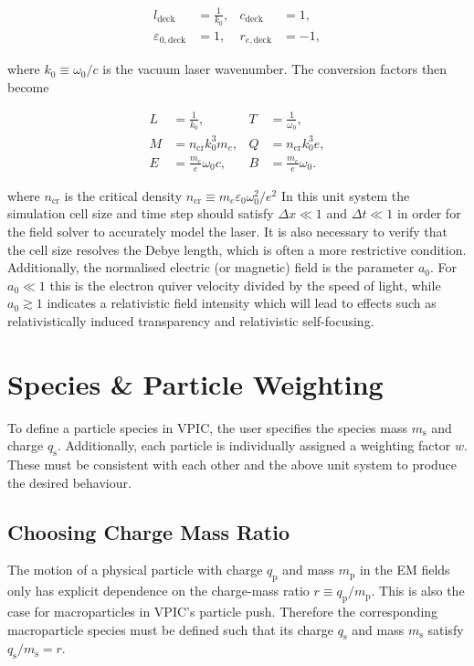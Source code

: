 \documentclass[twocolumn,10pt]{article}
\newcommand{\ncrit}{n_{\mathrm{cr}}}
\begin{document}
	\begin{align*}
		l_{\mathrm{deck}} &= \frac{1}{k_0}, &
		c_{\mathrm{deck}} &= 1, \\
		\varepsilon_{0,\mathrm{deck}} &= 1, &
		r_{e,\mathrm{deck}} &= -1,
	\end{align*}

	\noindent where $k_0 \equiv \omega_0/c$ is the vacuum laser wavenumber. The conversion factors then become

	\begin{align*}
		L &= \frac{1}{k_0}, &
		T &= \frac{1}{\omega_0}, \\
		M &= \ncrit k_0^3m_e, &
		Q &= \ncrit k_0^3e, \\
		E &= \frac{m_e}{e}\omega_0 c, &
		B &= \frac{m_e}{e}\omega_0.
	\end{align*}

	\noindent where $\ncrit$ is the critical density $\ncrit \equiv m_e\varepsilon_0\omega_0^2/e^2$ In this unit system the simulation cell size and time step should satisfy $\Delta x \ll 1$ and $\Delta t \ll 1$ in order for the field solver to accurately model the laser. It is also necessary to verify that the cell size resolves the Debye length, which is often a more restrictive condition. Additionally, the normalised electric (or magnetic) field is the parameter $a_0$. For $a_0 \ll 1$ this is the electron quiver velocity divided by the speed of light, while $a_0 \gtrsim 1$ indicates a relativistic field intensity which will lead to effects such as relativistically induced transparency and relativistic self-focusing.

	\section{Species \& Particle Weighting}

	To define a particle species in VPIC, the user specifies the species mass $m_{\mathrm{s}}$ and charge $q_{\mathrm{s}}$. Additionally, each particle is individually assigned a weighting factor $w$. These must be consistent with each other and the above unit system to produce the desired behaviour.

	\subsection{Choosing Charge Mass Ratio}

	The motion of a physical particle with charge $q_{\mathrm{p}}$ and mass $m_{\mathrm{p}}$ in the EM fields only has explicit dependence on the charge-mass ratio $r \equiv q_{\mathrm{p}}/m_{\mathrm{p}}$. This is also the case for macroparticles in VPIC's particle push. Therefore the corresponding macroparticle species must be defined such that its charge $q_{\mathrm{s}}$ and mass $m_{\mathrm{s}}$ satisfy $q_{\mathrm{s}}/m_{\mathrm{s}}=r$.
\end{document}
